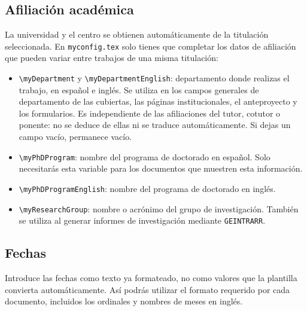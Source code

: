 \subsection{Afiliación académica}

La universidad y el centro se obtienen automáticamente de la titulación seleccionada. En \texttt{myconfig.tex} solo tienes que completar los datos de afiliación que pueden variar entre trabajos de una misma titulación:

\begin{itemize}
  \item \texttt{\textbackslash{}myDepartment} y \texttt{\textbackslash{}myDepartmentEnglish}: departamento donde realizas el trabajo, en español e inglés. Se utiliza en los campos generales de departamento de las cubiertas, las páginas institucionales, el anteproyecto y los formularios. Es independiente de las afiliaciones del tutor, cotutor o ponente: no se deduce de ellas ni se traduce automáticamente. Si dejas un campo vacío, permanece vacío.
  \item \texttt{\textbackslash{}myPhDProgram}: nombre del programa de doctorado en español. Solo necesitarás esta variable para los documentos que muestren esta información.
  \item \texttt{\textbackslash{}myPhDProgramEnglish}: nombre del programa de doctorado en inglés.
  \item \texttt{\textbackslash{}myResearchGroup}: nombre o acrónimo del grupo de investigación. También se utiliza al generar informes de investigación mediante \texttt{GEINTRARR}.
\end{itemize}

\subsection{Fechas}
\label{sec:fechas-configuracion}

Introduce las fechas como texto ya formateado, no como valores que la plantilla convierta automáticamente. Así podrás utilizar el formato requerido por cada documento, incluidos los ordinales y nombres de meses en inglés.

